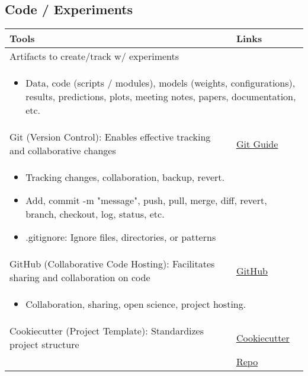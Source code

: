 \subsection{Code / Experiments}
\begin{summary}
    \begin{center}
        \begin{tabular}{ll}
            \toprule
            \textbf{Tools} & \textbf{Links} \\
            \toprule
            Artifacts to create/track w/ experiments & \\
            \multicolumn{2}{p{\linewidth}}{
            \begin{itemize}
                \item Data, code (scripts / modules), models (weights, configurations), results, predictions, plots, meeting notes, papers, documentation, etc.
            \end{itemize}} \\
            \midrule
            Git (Version Control): Enables effective tracking and collaborative changes & \href{https://rogerdudler.github.io/git-guide/}{Git Guide} \\
            \multicolumn{2}{p{\linewidth}}{
            \begin{itemize}
                \item Tracking changes, collaboration, backup, revert.
                \item Add, commit -m "message", push, pull, merge, diff, revert, branch, checkout, log, status, etc.
                \item .gitignore: Ignore files, directories, or patterns
            \end{itemize}} \\
            \midrule
            GitHub (Collaborative Code Hosting): Facilitates sharing and collaboration on code & \href{https://github.com/git-guides}{GitHub} \\
            \multicolumn{2}{p{\linewidth}}{
            \begin{itemize}
                \item Collaboration, sharing, open science, project hosting.
            \end{itemize}} \\
            \midrule
            Cookiecutter (Project Template): Standardizes project structure & \href{https://cookiecutter.readthedocs.io/en/1.7.2/}{Cookiecutter} \\
            & \href{https://github.com/drivendataorg/cookiecutter-data-science}{Repo} \\

\end{tabular}
\end{center}
\end{summary}
